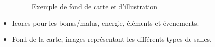 \begin{itemize}
\begin{figure}[h]
\begin{center}
%
\qquad
{}%
\caption{\label{slaythespiregame}Exemple de fond de carte et d'illustration}
\end{center}
\end{figure}

    \item Icones pour les bonus/malus, energie, éléments et évenements.
    \item Fond de la carte, images représentant les différents types de salles.
\end{itemize}


\clearpage

